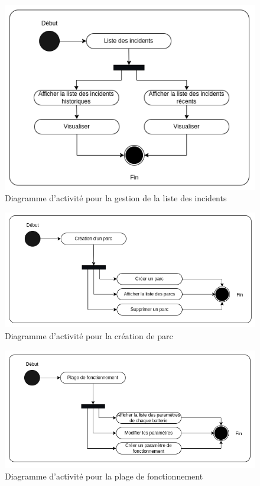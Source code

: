 \begin{figure}[H]
	\centering
	\includegraphics[width=14cm]{./img/composants/diagramme/Activiter-incident.png}
	\caption{Diagramme d'activité pour la gestion de la liste des incidents}
\end{figure}
\begin{figure}[H]
	\centering
	\includegraphics[width=16cm]{./img/composants/diagramme/creationParc.png}
	\caption{Diagramme d'activité pour la création de parc}
\end{figure}

\begin{figure}[H]
	\centering
	\includegraphics[width=16cm]{./img/composants/diagramme/Activiter-plagefonctionnement.png}
	\caption{Diagramme d'activité pour la plage de fonctionnement}
\end{figure}


